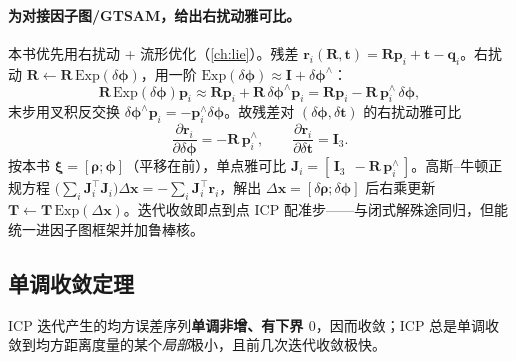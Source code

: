 \paragraph{为对接因子图/GTSAM，给出右扰动雅可比。}
本书优先用右扰动 + 流形优化（\cref{ch:lie}）。残差 $\mathbf{r}_i(\mathbf{R},\mathbf{t})=\mathbf{R}\mathbf{p}_i+\mathbf{t}-\mathbf{q}_i$。右扰动 $\mathbf{R}\leftarrow\mathbf{R}\,\mathrm{Exp}(\delta\boldsymbol{\phi})$，用一阶 $\mathrm{Exp}(\delta\boldsymbol{\phi})\approx\mathbf{I}+\delta\boldsymbol{\phi}^\wedge$：
\begin{equation}
  \mathbf{R}\,\mathrm{Exp}(\delta\boldsymbol{\phi})\mathbf{p}_i\approx\mathbf{R}\mathbf{p}_i+\mathbf{R}\,\delta\boldsymbol{\phi}^\wedge\mathbf{p}_i
  =\mathbf{R}\mathbf{p}_i-\mathbf{R}\,\mathbf{p}_i^\wedge\,\delta\boldsymbol{\phi},
\end{equation}
末步用叉积反交换 $\delta\boldsymbol{\phi}^\wedge\mathbf{p}_i=-\mathbf{p}_i^\wedge\delta\boldsymbol{\phi}$。故残差对 $(\delta\boldsymbol{\phi},\delta\mathbf{t})$ 的右扰动雅可比
\begin{equation}
  \frac{\partial\mathbf{r}_i}{\partial\delta\boldsymbol{\phi}}=-\mathbf{R}\,\mathbf{p}_i^\wedge,\qquad
  \frac{\partial\mathbf{r}_i}{\partial\delta\mathbf{t}}=\mathbf{I}_3.
  \label{eq:pc-icp-jac}
\end{equation}
按本书 $\boldsymbol{\xi}=[\boldsymbol{\rho};\boldsymbol{\phi}]$（平移在前），单点雅可比 $\mathbf{J}_i=[\,\mathbf{I}_3\ \ -\mathbf{R}\,\mathbf{p}_i^\wedge\,]$。高斯--牛顿正规方程 $\big(\sum_i\mathbf{J}_i^\top\mathbf{J}_i\big)\Delta\mathbf{x}=-\sum_i\mathbf{J}_i^\top\mathbf{r}_i$，解出 $\Delta\mathbf{x}=[\delta\boldsymbol{\rho};\delta\boldsymbol{\phi}]$ 后右乘更新 $\mathbf{T}\leftarrow\mathbf{T}\,\mathrm{Exp}(\Delta\mathbf{x})$。迭代收敛即点到点 ICP 配准步——与闭式解殊途同归，但能统一进因子图框架并加鲁棒核。

\subsection{单调收敛定理}
\label{sec:pc-icp-convergence}

\begin{theorem}\label{thm:pc-convergence}
ICP 迭代产生的均方误差序列\textbf{单调非增、有下界 $0$}，因而收敛；ICP 总是单调收敛到均方距离度量的某个\emph{局部}极小，且前几次迭代收敛极快\cite{besl1992icp}。
\end{theorem}

